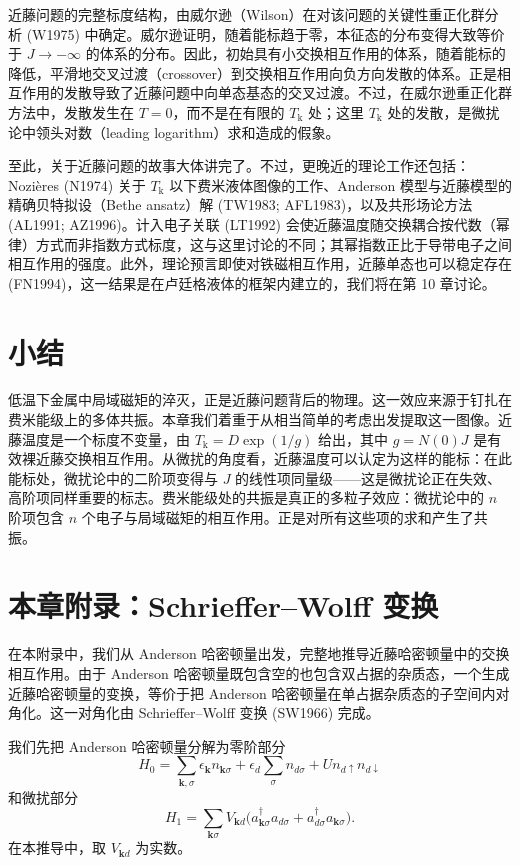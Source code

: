 近藤问题的完整标度结构，由威尔逊（Wilson）在对该问题的关键性重正化群分析 (W1975) 中确定。威尔逊证明，随着能标趋于零，本征态的分布变得大致等价于 $J \to -\infty$ 的体系的分布。因此，初始具有小交换相互作用的体系，随着能标的降低，平滑地交叉过渡（crossover）到交换相互作用向负方向发散的体系。正是相互作用的发散导致了近藤问题中向单态基态的交叉过渡。不过，在威尔逊重正化群方法中，发散发生在 $T = 0$，而不是在有限的 $T_{\mathrm{k}}$ 处；这里 $T_{\mathrm{k}}$ 处的发散，是微扰论中领头对数（leading logarithm）求和造成的假象。

至此，关于近藤问题的故事大体讲完了。不过，更晚近的理论工作还包括：Nozières (N1974) 关于 $T_{\mathrm{k}}$ 以下费米液体图像的工作、Anderson 模型与近藤模型的精确贝特拟设（Bethe ansatz）解 (TW1983; AFL1983)，以及共形场论方法 (AL1991; AZ1996)。计入电子关联 (LT1992) 会使近藤温度随交换耦合按代数（幂律）方式而非指数方式标度，这与这里讨论的不同；其幂指数正比于导带电子之间相互作用的强度。此外，理论预言即使对铁磁相互作用，近藤单态也可以稳定存在 (FN1994)，这一结果是在卢廷格液体的框架内建立的，我们将在第 10 章讨论。

\section*{小结}

低温下金属中局域磁矩的淬灭，正是近藤问题背后的物理。这一效应来源于钉扎在费米能级上的多体共振。本章我们着重于从相当简单的考虑出发提取这一图像。近藤温度是一个标度不变量，由 $T_{\mathrm{k}} = D\exp(1/g)$ 给出，其中 $g = N(0)J$ 是有效裸近藤交换相互作用。从微扰的角度看，近藤温度可以认定为这样的能标：在此能标处，微扰论中的二阶项变得与 $J$ 的线性项同量级——这是微扰论正在失效、高阶项同样重要的标志。费米能级处的共振是真正的多粒子效应：微扰论中的 $n$ 阶项包含 $n$ 个电子与局域磁矩的相互作用。正是对所有这些项的求和产生了共振。

\section*{本章附录：Schrieffer--Wolff 变换}

在本附录中，我们从 Anderson 哈密顿量出发，完整地推导近藤哈密顿量中的交换相互作用。由于 Anderson 哈密顿量既包含空的也包含双占据的杂质态，一个生成近藤哈密顿量的变换，等价于把 Anderson 哈密顿量在单占据杂质态的子空间内对角化。这一对角化由 Schrieffer--Wolff 变换 (SW1966) 完成。

我们先把 Anderson 哈密顿量分解为零阶部分
\begin{equation*}
H_{0} = \sum_{\mathbf{k},\sigma} \epsilon_{\mathbf{k}} n_{\mathbf{k}\sigma} + \epsilon_{d} \sum_{\sigma} n_{d\sigma} + U n_{d\uparrow} n_{d\downarrow}
\tag{8.110}
\end{equation*}
和微扰部分
\begin{equation*}
H_{1} = \sum_{\mathbf{k}\sigma} V_{\mathbf{k}d} \big( a_{\mathbf{k}\sigma}^{\dagger} a_{d\sigma} + a_{d\sigma}^{\dagger} a_{\mathbf{k}\sigma} \big).
\tag{8.111}
\end{equation*}
在本推导中，取 $V_{\mathbf{k}d}$ 为实数。

